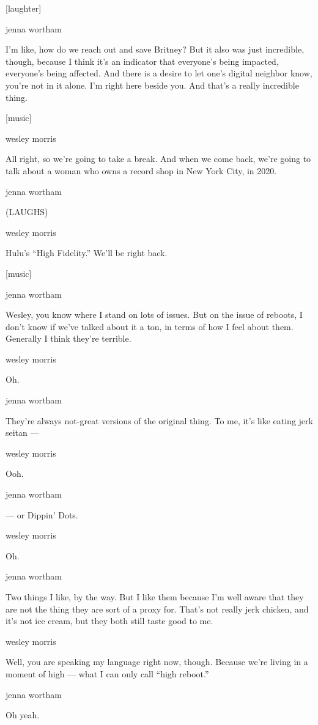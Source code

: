 {[}laughter{]}

jenna wortham

I'm like, how do we reach out and save Britney? But it also was just
incredible, though, because I think it's an indicator that everyone's
being impacted, everyone's being affected. And there is a desire to let
one's digital neighbor know, you're not in it alone. I'm right here
beside you. And that's a really incredible thing.

{[}music{]}

wesley morris

All right, so we're going to take a break. And when we come back, we're
going to talk about a woman who owns a record shop in New York City, in
2020.

jenna wortham

(LAUGHS)

wesley morris

Hulu's ``High Fidelity.'' We'll be right back.

{[}music{]}

jenna wortham

Wesley, you know where I stand on lots of issues. But on the issue of
reboots, I don't know if we've talked about it a ton, in terms of how I
feel about them. Generally I think they're terrible.

wesley morris

Oh.

jenna wortham

They're always not-great versions of the original thing. To me, it's
like eating jerk seitan ---

wesley morris

Ooh.

jenna wortham

--- or Dippin' Dots.

wesley morris

Oh.

jenna wortham

Two things I like, by the way. But I like them because I'm well aware
that they are not the thing they are sort of a proxy for. That's not
really jerk chicken, and it's not ice cream, but they both still taste
good to me.

wesley morris

Well, you are speaking my language right now, though. Because we're
living in a moment of high --- what I can only call ``high reboot.''

jenna wortham

Oh yeah.


